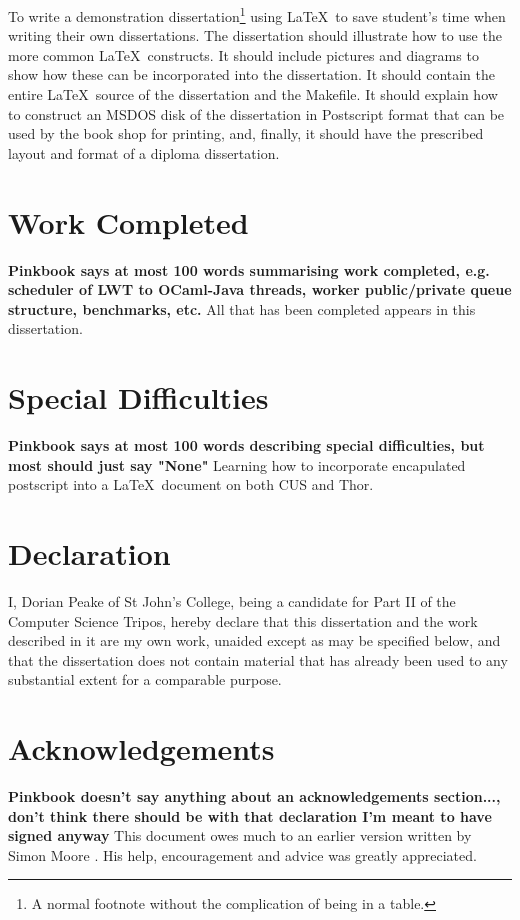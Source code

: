 \documentclass[12pt,twoside,notitlepage]{report}
\begin{document}
To write a demonstration dissertation\footnote{A normal footnote without the
complication of being in a table.} using \LaTeX\ to save
student's time when writing their own dissertations. The dissertation
should illustrate how to use the more common \LaTeX\ constructs. It
should include pictures and diagrams to show how these can be
incorporated into the dissertation.  It should contain the entire
\LaTeX\ source of the dissertation and the Makefile.  It should
explain how to construct an MSDOS disk of the dissertation in
Postscript format that can be used by the book shop for printing, and,
finally, it should have the prescribed layout and format of a diploma
dissertation.


\section*{Work Completed}
{\bf Pinkbook says at most 100 words summarising work completed, e.g. scheduler of LWT to OCaml-Java threads, worker public/private queue structure, benchmarks, etc.}
All that has been completed appears in this dissertation.

\section*{Special Difficulties}
{\bf Pinkbook says at most 100 words describing special difficulties, but most should just say "None" }
Learning how to incorporate encapulated postscript into a \LaTeX\
document on both CUS and Thor.
 
\newpage
\section*{Declaration}

I, Dorian Peake of St John's College, being a candidate for Part II of the Computer
Science Tripos, hereby declare
that this dissertation and the work described in it are my own work,
unaided except as may be specified below, and that the dissertation
does not contain material that has already been used to any substantial
extent for a comparable purpose.

\bigskip
{}

\medskip
{}

\cleardoublepage

\tableofcontents

\listoffigures

\newpage
\section*{Acknowledgements}
{\bf Pinkbook doesn't say anything about an acknowledgements section..., don't think there should be with that declaration I'm meant to have signed anyway}
This document owes much to an earlier version written by Simon Moore
.  His help, encouragement and advice was greatly 
appreciated.
\end{document}
